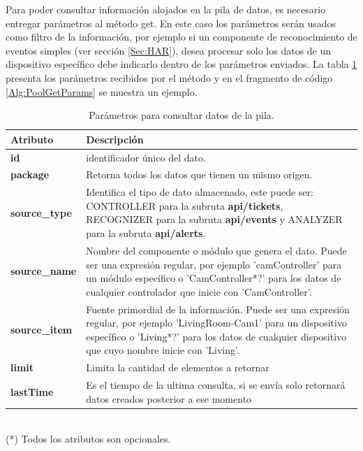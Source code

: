             Para poder consultar información alojados en la pila de datos, es necesario entregar parámetros al método get. En este caso los parámetros serán usados como filtro de la información, por ejemplo si un componente de reconocimiento de eventos simples (ver sección \ref{Sec:HAR}), desea procesar solo los datos de un dispositivo específico debe indicarlo dentro de los parámetros enviados. La tabla \ref{Tab:PoolGetParams} presenta los parámetros recibidos por el método y en el fragmento de código \ref{Alg:PoolGetParams} se muestra un ejemplo.
            
            \begin{table}[ht!]
            \caption[Parámetros para consultar datos de la pila]{Parámetros para consultar datos de la pila.}
            \label{Tab:PoolGetParams}
            \centering
            \begin{tabular}{ | l p{11cm} | } 
                \hline
                 \textbf{Atributo}      & \textbf{Descripción} \\ 
                \hline\hline
                \textbf{id}             & identificador único del dato. \\
                \hline
                \textbf{package}        & Retorna todos los datos que tienen un mismo origen. \\
                \hline
                \textbf{source\_type}   & Identifica el tipo de dato almacenado, este puede ser: CONTROLLER para la subruta \textbf{api/tickets}, RECOGNIZER para la subruta \textbf{api/events} y ANALYZER para la subruta \textbf{api/alerts}.\\
                \hline
                \textbf{source\_name}    & Nombre del componente o módulo que genera el dato. Puede ser una expresión regular, por ejemplo 'camController' para un módulo específico o 'CamController*?' para los datos de cualquier controlador que inicie con 'CamController'. \\
                \hline
                \textbf{source\_item}   & Fuente primordial de la información. Puede ser una expresión regular, por ejemplo 'LivingRoom-Cam1' para un dispositivo específico o 'Living*?' para los datos de cualquier dispositivo que cuyo nombre inicie con 'Living'. \\
                \hline
                \textbf{limit}          & Limita la cantidad de elementos a retornar \\
                \hline
                \textbf{lastTime}        & Es el tiempo de la ultima consulta, si se envía solo retornará datos creados posterior a ese momento \\
                \hline
            \end{tabular}
            \\{(*) Todos los atributos son opcionales.}
            \end{table}
            
